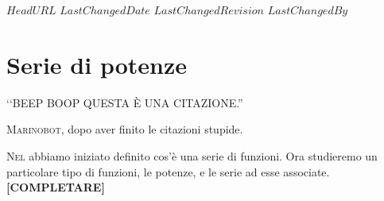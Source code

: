 \svnidlong
{$HeadURL$}
{$LastChangedDate$}
{$LastChangedRevision$}
{$LastChangedBy$}

\chapter{Serie di potenze}

\begin{introduction}
	‘‘BEEP BOOP QUESTA È UNA CITAZIONE.''
	\begin{flushright}
		\textsc{Marinobot,} dopo aver finito le citazioni stupide.
	\end{flushright}
\end{introduction}
\lettrine[findent=1pt, nindent=0pt]{N}{el}  abbiamo iniziato definito cos'è una serie di funzioni. Ora studieremo un particolare tipo di funzioni, le potenze, e le serie ad esse associate.
\textbf{[COMPLETARE]} %
